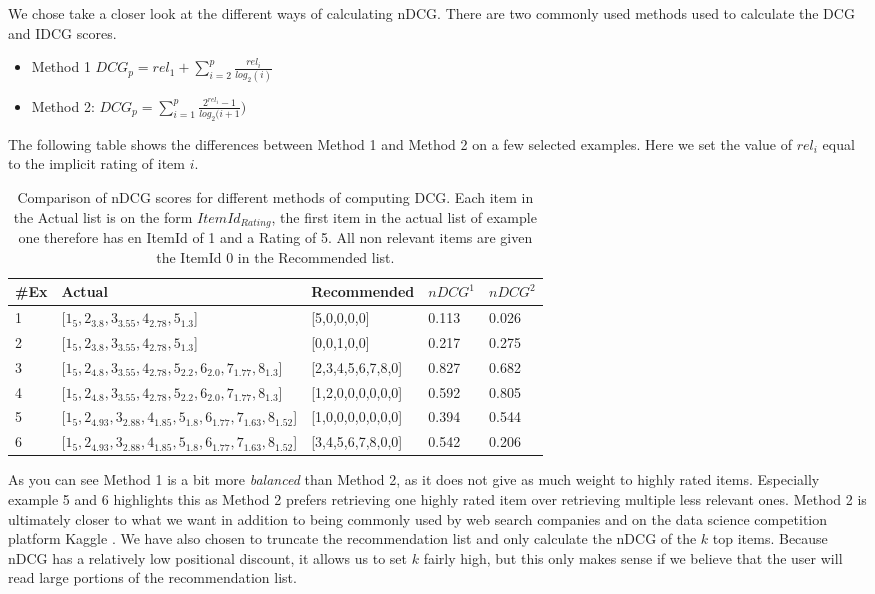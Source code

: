 We chose take a closer look at the different ways of calculating nDCG. There are two commonly used methods used to calculate the DCG and IDCG scores.

\begin{itemize}
\item Method 1  $DCG_p = rel_1 + \sum_{i=2}^{p} \frac{rel_i}{log_2(i)}$
\item Method 2: $DCG_p = \sum_{i=1}^{p} \frac{2^{rel_i}-1}{log_2(i+1})$
\end{itemize}

The following table shows the differences between Method 1 and Method 2 on a few selected examples. Here we set the value of $rel_i$ equal to the implicit rating of item $i$.

\begin{table}[H]
\label{table:ndcgfinal}
\centering
\begin{tabular}{*{5}l}
\toprule
\#Ex & 	Actual																	& 	Recommended				&	$nDCG^1$  	   & $nDCG^2$	\\ \midrule
1 		& 	[$1_{5}, 2_{3.8}, 3_{3.55}, 4_{2.78},5_{1.3}$]								&	[5,0,0,0,0]				&	0.113 		   & 0.026  \\ 
2 		& 	[$1_{5}, 2_{3.8}, 3_{3.55}, 4_{2.78},5_{1.3}$]								&	[0,0,1,0,0]				&	0.217 		   & 0.275   \\ 
3   	& 	[$1_{5},2_{4.8}, 3_{3.55}, 4_{2.78}, 5_{2.2}, 6_{2.0},7_{1.77},8_{1.3}$]		&	[2,3,4,5,6,7,8,0]		&	0.827		   & 0.682   \\ 
4  		& 	[$1_{5},2_{4.8}, 3_{3.55}, 4_{2.78}, 5_{2.2}, 6_{2.0},7_{1.77},8_{1.3}$]		&	[1,2,0,0,0,0,0,0]		&	0.592 		   & 0.805   \\
5 		& 	[$1_{5},2_{4.93},3_{2.88}, 4_{1.85},5_{1.8},6_{1.77}, 7_{1.63},8_{1.52}$]	&	[1,0,0,0,0,0,0,0]		&	0.394 		   & 0.544   \\
6 		& 	[$1_{5},2_{4.93},3_{2.88}, 4_{1.85},5_{1.8},6_{1.77}, 7_{1.63},8_{1.52}$]	&	[3,4,5,6,7,8,0,0]		&	0.542 		   & 0.206   \\
\bottomrule
\end{tabular}
\caption{Comparison of nDCG scores for different methods of computing DCG. Each item in the Actual list is on the form $ItemId_{Rating}$, the first item in the actual list of example one therefore has en ItemId of 1 and a Rating of 5. All non relevant items are given the ItemId 0 in the Recommended list.}
\end{table}

As you can see Method 1 is a bit more \emph{balanced} than Method 2, as it does not give as much weight to highly rated items. Especially example 5 and 6 highlights this as Method 2 prefers retrieving one highly rated item over retrieving multiple less relevant ones. Method 2 is ultimately closer to what we want in addition to being commonly used by web search companies and on the data science competition platform Kaggle \cite{kaggle}. We have also chosen to truncate the recommendation list and only calculate the nDCG of the $k$ top items. Because nDCG has a relatively low positional discount, it allows us to set $k$ fairly high, but this only makes sense if we believe that the user will read large portions of the recommendation list. 

